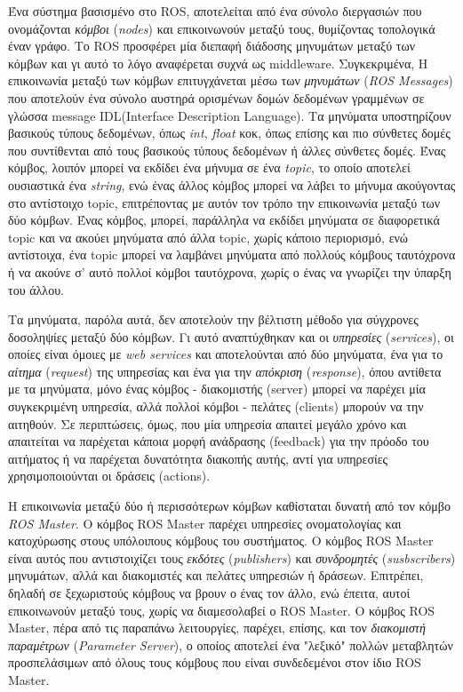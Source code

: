 \bigskip
Ένα σύστημα βασισμένο στο ROS, αποτελείται από ένα σύνολο διεργασιών που ονομάζονται \textit{κόμβοι} (\textit{nodes}) και επικοινωνούν μεταξύ τους, θυμίζοντας τοπολογικά έναν γράφο. Το ROS προσφέρει μία διεπαφή διάδοσης μηνυμάτων μεταξύ των κόμβων και γι αυτό το λόγο αναφέρεται συχνά ως middleware. Συγκεκριμένα, Η επικοινωνία μεταξύ των κόμβων επιτυγχάνεται μέσω των \textit{μηνυμάτων} (\textit{ROS Messages}) που αποτελούν ένα σύνολο αυστηρά ορισμένων δομών δεδομένων γραμμένων σε γλώσσα message IDL(Interface Description Language). Τα μηνύματα υποστηρίζουν βασικούς τύπους δεδομένων, όπως \textit{int}, \textit{float} κοκ, όπως επίσης και πιο σύνθετες δομές που συντίθενται από τους βασικούς τύπους δεδομένων ή άλλες σύνθετες δομές. Ένας κόμβος, λοιπόν μπορεί να εκδίδει ένα μήνυμα σε ένα \textit{topic}, το οποίο αποτελεί ουσιαστικά ένα \textit{string}, ενώ ένας άλλος κόμβος μπορεί να λάβει το μήνυμα ακούγοντας στο αντίστοιχο topic, επιτρέποντας με αυτόν τον τρόπο την επικοινωνία μεταξύ των δύο κόμβων. Ένας κόμβος, μπορεί, παράλληλα να εκδίδει μηνύματα σε διαφορετικά topic και να ακούει μηνύματα από άλλα topic, χωρίς κάποιο περιορισμό, ενώ αντίστοιχα, ένα topic μπορεί να λαμβάνει μηνύματα από πολλούς κόμβους ταυτόχρονα ή να ακούνε σ' αυτό πολλοί κόμβοι ταυτόχρονα, χωρίς ο ένας να γνωρίζει την ύπαρξη του άλλου.

\bigskip
Τα μηνύματα, παρόλα αυτά, δεν αποτελούν την βέλτιστη μέθοδο για σύγχρονες δοσοληψίες μεταξύ δύο κόμβων. Γι αυτό αναπτύχθηκαν και οι \textit{υπηρεσίες} (\textit{services}), οι οποίες είναι όμοιες με \textit{web services} και αποτελούνται από δύο μηνύματα, ένα για το \textit{αίτημα} (\textit{request}) της υπηρεσίας και ένα για την \textit{απόκριση} (\textit{response}), όπου αντίθετα με τα μηνύματα, μόνο ένας κόμβος - διακομιστής (server) μπορεί να παρέχει μία συγκεκριμένη υπηρεσία, αλλά πολλοί κόμβοι - πελάτες (clients) μπορούν να την αιτηθούν. Σε περιπτώσεις, όμως, που μία υπηρεσία απαιτεί μεγάλο χρόνο και απαιτείται να παρέχεται κάποια μορφή ανάδρασης (feedback) για την πρόοδο του αιτήματος ή να παρέχεται δυνατότητα διακοπής αυτής, αντί για υπηρεσίες χρησιμοποιούνται οι δράσεις (actions). 

\bigskip
Η επικοινωνία μεταξύ δύο ή περισσότερων κόμβων καθίσταται δυνατή από τον κόμβο \textit{ROS Master}. Ο κόμβος ROS Master παρέχει υπηρεσίες ονοματολογίας και κατοχύρωσης στους υπόλοιπους κόμβους του συστήματος. Ο κόμβος ROS Master είναι αυτός που αντιστοιχίζει τους \textit{εκδότες} (\textit{publishers}) και \textit{συνδρομητές} (\textit{susbscribers}) μηνυμάτων, αλλά και διακομιστές και πελάτες υπηρεσιών ή δράσεων. Επιτρέπει, δηλαδή σε ξεχωριστούς κόμβους να βρουν ο ένας τον άλλο, ενώ έπειτα, αυτοί επικοινωνούν μεταξύ τους, χωρίς να διαμεσολαβεί ο ROS Master. Ο κόμβος ROS Master, πέρα από τις παραπάνω λειτουργίες, παρέχει, επίσης, και τον \textit{διακομιστή παραμέτρων} (\textit{Parameter Server}), ο οποίος αποτελεί ένα "λεξικό" πολλών μεταβλητών προσπελάσιμων από όλους τους κόμβους που είναι συνδεδεμένοι στον ίδιο ROS Master.

